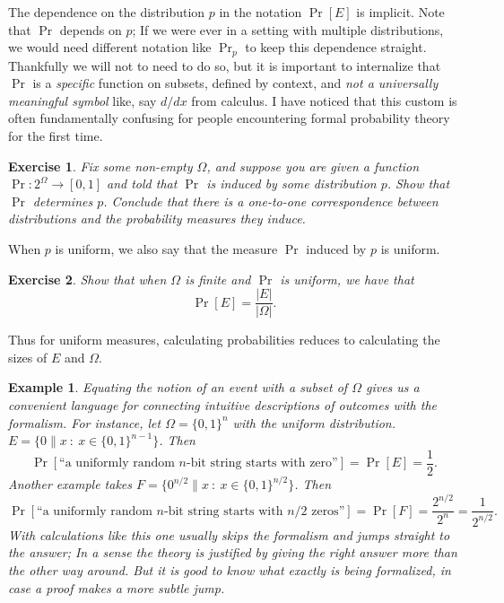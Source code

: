 \documentclass[11pt]{article}
\newtheorem{exercise}{Exercise}
\newtheorem{example}{Example}
\newcommand{\bits}{\{0,1\}}
\begin{document}
The dependence on the distribution $p$ in the notation $\Pr[E]$ is implicit.
Note that $\Pr$ depends on $p$; If we were ever in a setting with multiple
distributions, we would need different notation like $\Pr_p$ to keep this
dependence straight. Thankfully we will not to need to do so, but it is
important to internalize that $\Pr$ is a \emph{specific} function on subsets,
defined by context, and \emph{not a universally meaningful symbol} like, say
$d/dx$ from calculus. I have noticed that this custom is often fundamentally
confusing for people encountering formal probability theory for the first time.

\begin{exercise}
    Fix some non-empty $\Omega$, and suppose you are given a function
    $\Pr:2^{\Omega}\to[0,1]$ and told that $\Pr$ is induced by some
    distribution $p$. Show that $\Pr$ determines $p$. Conclude that there
    is a one-to-one correspondence between distributions and the probability
    measures they induce.
\end{exercise}
When $p$ is uniform, we also say that the measure $\Pr$ induced by $p$ is
uniform. 

\begin{exercise}
    Show that
    when $\Omega$ is finite and $\Pr$ is uniform, 
    we have that
    \[
        \Pr[E] = \frac{|E|}{|\Omega|}.
    \]
\end{exercise}
Thus for uniform measures, calculating probabilities reduces to calculating the
sizes of $E$ and $\Omega$.

\begin{example}
Equating the notion of an event with a subset of $\Omega$ gives us a
convenient language for connecting intuitive descriptions of outcomes
with the formalism. For instance, let $\Omega = \bits^n$ with the uniform
distribution.
    $E = \{0\|x \ : \ x\in\bits^{n-1}\}$. Then 
    \[
        \Pr[\text{``a uniformly random $n$-bit string starts with zero''}] = \Pr[E] = \frac{1}{2}.
    \]
    Another example takes 
    $F = \{0^{n/2}\|x \ : \ x\in\bits^{n/2}\}$. Then 
    \[
        \Pr[\text{``a uniformly random $n$-bit string starts with $n/2$ zeros''}] =
        \Pr[F] = \frac{2^{n/2}}{2^n} = \frac{1}{2^{n/2}}.
    \]
    With calculations like this one usually skips the formalism and jumps
    straight to the answer; In a sense the theory is justified by giving the
    right answer more than the other way around.  But it is good to know what
    exactly is being formalized, in case a proof
    makes a more subtle jump.
\end{example}
\end{document}
